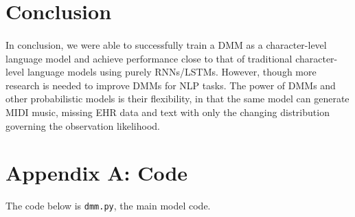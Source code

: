 \documentclass[justified,nobib]{tufte-handout}
\begin{document}
\begin{fullwidth}
\section{Conclusion}

\paragraph{} In conclusion, we were able to successfully train a DMM as a character-level language model and achieve performance close to that of traditional character-level language models using purely RNNs/LSTMs. However, though more research is needed to improve DMMs for NLP tasks. The power of DMMs and other probabilistic models is their flexibility, in that the same model can generate MIDI music, missing EHR data and text with only the changing distribution governing the observation likelihood. 

{}

\clearpage
\section{Appendix A: Code}
The code below is \texttt{dmm.py}, the main model code. 

\end{fullwidth}
\end{document}
